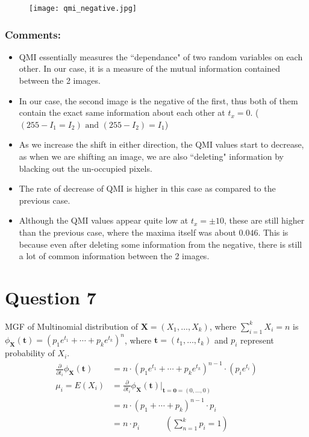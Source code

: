\documentclass[11pt, fleqn]{article}
\begin{document}
\newpage
\begin{figure}[H]
    \centering
    \texttt{[image: qmi\_negative.jpg]}
    \label{q6ic}
\end{figure}

\subsubsection*{Comments:}
\begin{itemize}
    \item QMI essentially measures the ``dependance" of two random variables on each other. In our case, it is a measure of the mutual information contained between the 2 images.
    \item In our case, the second image is the negative of the first, thus both of them contain the exact same information about each other at $t_x = 0.$ ($(255 - I_1 = I_2) \text{ and } (255-I_2) = I_1$)
    \item As we increase the shift in either direction, the QMI values start to decrease, as when we are shifting an image, we are also ``deleting" information by blacking out the un-occupied pixels.
    \item The rate of decrease of QMI is higher in this case as compared to the previous case.
    \item Although the QMI values appear quite low at $t_x = \pm 10$, these are still higher than the previous case, where the maxima itself was about $0.046$. This is because even after deleting some information from the negative, there is still a lot of common information between the 2 images.
\end{itemize}




\newpage
\section*{Question 7}
\setcounter{equation}{0}

MGF of Multinomial distribution of $\mathbf{X} = (X_1, \dots, X_k)$, where $\sum_{i=1}^{k} X_i = n$ is $\phi_{\mathbf{X}}(\mathbf{t}) = (p_1 e^{t_1} + \cdots + p_k e^{t_k})^{n}$, where $\mathbf{t} = (t_1, \dots, t_k)$ and $p_i$ represent probability of $X_i$. \\
\begin{equation*}
    \begin{split}
        \frac{\partial}{\partial t_i} \phi_{\mathbf{X}}(\mathbf{t}) &= n \cdot (p_1 e^{t_1} + \cdots + p_k e^{t_k})^{n-1} \cdot (p_i e^{t_i}) \\
        \mu_i = E(X_i) &= \frac{\partial}{\partial t_i} \phi_{\mathbf{X}}(\mathbf{t}) \bigg\rvert_{\mathbf{t} = \mathbf{0} = (0, \dots, 0)} \\
            &= n \cdot (p_1 + \cdots + p_k)^{n-1} \cdot p_i \\
            &= n \cdot p_i \hspace{3em} (\sum_{n=1}^{k} p_i = 1) 
    \end{split}
\end{equation*}
\end{document}
